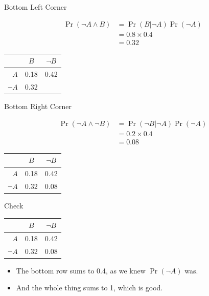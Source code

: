 \documentclass[
  ignorenonframetext,
]{beamer}
\providecommand{\tightlist}{%
  \setlength{\itemsep}{0pt}\setlength{\parskip}{0pt}}
\renewcommand{\,}{\text{, }}
\begin{document}
\begin{frame}{Bottom Left Corner}
\protect\hypertarget{bottom-left-corner}{}

\begin{align*}
\Pr(\neg A \wedge B) &= \Pr( B | \neg A) \Pr(\neg A) \\
 &= 0.8 \times 0.4 \\
 &= 0.32
\end{align*}

\pause

\begin{longtable}[]{@{}rcc@{}}
\toprule
& \(B\) & \(\neg B\)\tabularnewline
\midrule
\endhead
\(A\) & 0.18 & 0.42\tabularnewline
\(\neg A\) & 0.32 &\tabularnewline
\bottomrule
\end{longtable}

\end{frame}

\begin{frame}{Bottom Right Corner}
\protect\hypertarget{bottom-right-corner}{}

\begin{align*}
\Pr(\neg A \wedge \neg B) &= \Pr( \neg B | \neg A) \Pr(\neg A) \\
 &= 0.2 \times 0.4 \\
 &= 0.08
\end{align*}

\pause

\begin{longtable}[]{@{}rcc@{}}
\toprule
& \(B\) & \(\neg B\)\tabularnewline
\midrule
\endhead
\(A\) & 0.18 & 0.42\tabularnewline
\(\neg A\) & 0.32 & 0.08\tabularnewline
\bottomrule
\end{longtable}

\end{frame}

\begin{frame}{Check}
\protect\hypertarget{check-1}{}

\begin{longtable}[]{@{}rcc@{}}
\toprule
& \(B\) & \(\neg B\)\tabularnewline
\midrule
\endhead
\(A\) & 0.18 & 0.42\tabularnewline
\(\neg A\) & 0.32 & 0.08\tabularnewline
\bottomrule
\end{longtable}

\begin{itemize}
\tightlist
\item
  The bottom row sums to 0.4, as we knew \(\Pr(\neg A)\) was.
\item
  And the whole thing sums to 1, which is good.
\end{itemize}

\end{frame}
\end{document}
